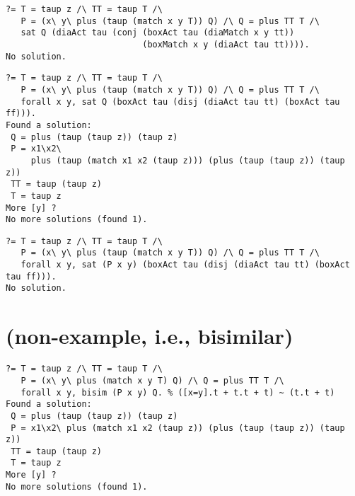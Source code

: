 \documentclass{article}
\renewcommand{\vDash}{\models}
\newcommand{\ttt}{\mathtt{t\hspace*{-.25em}t}}
\newcommand{\boxm}[1]{\mathopen{\big[ #1 \big]}} %
\newcommand{\diam}[1]{\mathopen{\big\langle #1 \big\rangle}}
\newcommand{\match}[1]{\mathopen{\left[#1\right]}}
\begin{document}
{\small%
\begin{verbatim}
?= T = taup z /\ TT = taup T /\
   P = (x\ y\ plus (taup (match x y T)) Q) /\ Q = plus TT T /\
   sat Q (diaAct tau (conj (boxAct tau (diaMatch x y tt))
                           (boxMatch x y (diaAct tau tt)))).
No solution.
\end{verbatim}
%
\fbox{$
\tau + \tau.\tau 
\vDash
\mathopen{\diam{\tau}}\left(
 \boxm{\tau}\diam{x=y}\ttt
 \wedge
 \boxm{x=y}\diam{\tau}\ttt
\right)
$}
{\small%
\begin{verbatim}
?= T = taup z /\ TT = taup T /\
   P = (x\ y\ plus (taup (match x y T)) Q) /\ Q = plus TT T /\ 
   forall x y, sat Q (boxAct tau (disj (diaAct tau tt) (boxAct tau ff))).
Found a solution:
 Q = plus (taup (taup z)) (taup z)
 P = x1\x2\
     plus (taup (match x1 x2 (taup z))) (plus (taup (taup z)) (taup z))
 TT = taup (taup z)
 T = taup z
More [y] ? 
No more solutions (found 1).
\end{verbatim}}
%
\fbox{$
\tau.[x=y]\tau + \tau + \tau.\tau 
\not\vDash
\mathopen{\diam{\tau}}\left(
 \boxm{\tau}\diam{x=y}\ttt
 \wedge
 \boxm{x=y}\diam{\tau}\ttt
\right)
$}
{\small%
\begin{verbatim}
?= T = taup z /\ TT = taup T /\
   P = (x\ y\ plus (taup (match x y T)) Q) /\ Q = plus TT T /\ 
   forall x y, sat (P x y) (boxAct tau (disj (diaAct tau tt) (boxAct tau ff))).
No solution.
\end{verbatim}}

\newpage
\section*{(non-example, i.e., bisimilar)}
\fbox{$
\match{x=y}\tau + \tau + \tau.\tau 
\sim
\tau + \tau.\tau 
$}
{\small%
\begin{verbatim}
?= T = taup z /\ TT = taup T /\
   P = (x\ y\ plus (match x y T) Q) /\ Q = plus TT T /\
   forall x y, bisim (P x y) Q. % ([x=y].t + t.t + t) ~ (t.t + t)
Found a solution:
 Q = plus (taup (taup z)) (taup z)
 P = x1\x2\ plus (match x1 x2 (taup z)) (plus (taup (taup z)) (taup z))
 TT = taup (taup z)
 T = taup z
More [y] ? 
No more solutions (found 1).
\end{verbatim}}

\newpage
}
\end{document}

